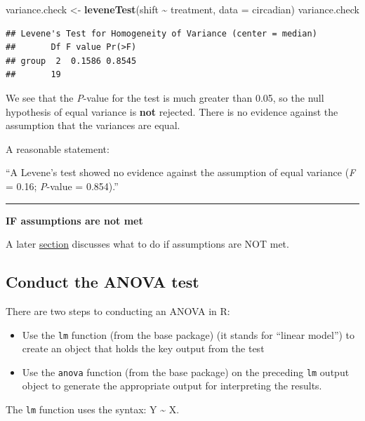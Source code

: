 \documentclass[
]{book}
\newenvironment{Shaded}{\begin{snugshade}}{\end{snugshade}}
\newcommand{\AttributeTok}[1]{\textcolor[rgb]{0.13,0.29,0.53}{#1}}
\newcommand{\FunctionTok}[1]{\textcolor[rgb]{0.13,0.29,0.53}{\textbf{#1}}}
\newcommand{\NormalTok}[1]{#1}
\newcommand{\OtherTok}[1]{\textcolor[rgb]{0.56,0.35,0.01}{#1}}
\newcommand{\SpecialCharTok}[1]{\textcolor[rgb]{0.81,0.36,0.00}{\textbf{#1}}}
\begin{document}
\begin{Shaded}
\begin{Highlighting}[]
\NormalTok{variance.check }\OtherTok{\textless{}{-}} \FunctionTok{leveneTest}\NormalTok{(shift }\SpecialCharTok{\textasciitilde{}}\NormalTok{ treatment, }\AttributeTok{data =}\NormalTok{ circadian)}
\NormalTok{variance.check}
\end{Highlighting}
\end{Shaded}

\begin{verbatim}
## Levene's Test for Homogeneity of Variance (center = median)
##       Df F value Pr(>F)
## group  2  0.1586 0.8545
##       19
\end{verbatim}

We see that the \emph{P}-value for the test is much greater than 0.05, so the null hypothesis of equal variance is \textbf{not} rejected. There is no evidence against the assumption that the variances are equal.

A reasonable statement:

``A Levene's test showed no evidence against the assumption of equal variance (\emph{F} = 0.16; \emph{P}-value = 0.854).''

\begin{center}\rule{0.5\linewidth}{0.5pt}\end{center}

\textbf{IF assumptions are not met}

A later \hyperref[assumpbad_anova]{section} discusses what to do if assumptions are NOT met.

\subsection{Conduct the ANOVA test}\label{do_anova1}

There are two steps to conducting an ANOVA in R:

\begin{itemize}
\item
  Use the \texttt{lm} function (from the base package) (it stands for ``linear model'') to create an object that holds the key output from the test
\item
  Use the \texttt{anova} function (from the base package) on the preceding \texttt{lm} output object to generate the appropriate output for interpreting the results.
\end{itemize}

The \texttt{lm} function uses the syntax: Y \textasciitilde{} X.
\end{document}
